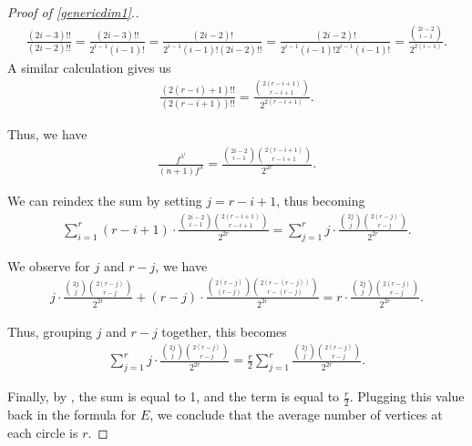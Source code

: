 \documentclass[11pt,reqno]{amsart}
\theoremstyle{definition}
\theoremstyle{problem}
\theoremstyle{plain}
\theoremstyle{remark}
\theoremstyle{theorem}
\numberwithin{equation}{section}
\numberwithin{figure}{section}
\theoremstyle{definition}
\theoremstyle{problem}
\theoremstyle{plain}
\begin{document}
\begin{proof}[Proof of \cref{genericdim1}.]
	\begin{gather*}
		\frac{(2i-3)!!}{(2i-2)!!}=\frac{(2i-3)!!}{2^{i-1}(i-1)!}
		=\frac{(2i-2)!}{2^{i-1}(i-1)!(2i-2)!!}
		=\frac{(2i-2)!}{2^{i-1}(i-1)!2^{i-1}(i-1)!}
		=\frac{\binom{2i-2}{i-1}}{2^{2(i-1)}}.
	\end{gather*}
	A similar calculation gives us 
	\begin{gather*}
		\frac{(2(r-i)+1)!!}{(2(r-i+1))!!} =
		\frac{\binom{2(r-i+1)}{r-i+1}}{2^{2(r-i+1)}}.
	\end{gather*}
	
	Thus, we have 
	\begin{gather*}
		\frac{f^{\lambda^{i}}}{(n+1)f^{\lambda}}
		=\frac{\binom{2i-2}{i-1}\binom{2(r-i+1)}{r-i+1}}{2^{2r}}.
	\end{gather*}
	
	We can reindex the sum by setting $j=r-i+1$, thus becoming
	\begin{gather*}
		\sum_{i=1}^{r}(r-i+1) \cdot
		\frac{\binom{2i-2}{i-1}\binom{2(r-i+1)}{r-i+1}}{2^{2r}} =
		\sum_{j=1}^{r}j\cdot
		\frac{\binom{2j}{j}\binom{2(r-j)}{r-j}}{2^{2r}}.
	\end{gather*}

  We observe for $j$ and $r-j$, we have
  \begin{gather*}
  j\cdot\frac{\binom{2j}{j}\binom{2(r-j)}{r-j}}{2^{2r}} + (r-j)\cdot\frac{\binom{2(r-j)}{(r-j)}\binom{2(r-(r-j))}{r-(r-j)}}{2^{2r}} = r\cdot\frac{\binom{2j}{j}\binom{2(r-j)}{r-j}}{2^{2r}}.
  \end{gather*}

  Thus, grouping $j$ and $r-j$ together, this becomes
  \begin{gather*}
  \sum_{j=1}^{r}j\cdot\frac{\binom{2j}{j}\binom{2(r-j)}{r-j}}{2^{2r}} = \frac{r}{2}\sum_{j=1}^{r}\frac{\binom{2j}{j}\binom{2(r-j)}{r-j}}{2^{2r}}.
  \end{gather*}

  Finally, by \cite{CBCC}, the sum is equal to 1, and the term is equal to $\frac{r}{2}$. Plugging this value back in the formula for $E$, we conclude that the average number of vertices at each circle is $r$. 
  \end{proof}
	
	
\end{document}
